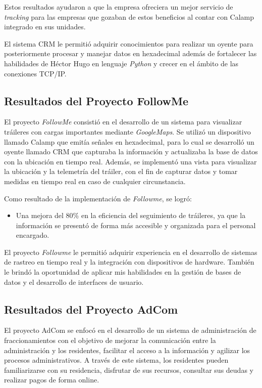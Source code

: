 \documentclass[protocolo.tex]{subfiles}
\begin{document}
Estos resultados ayudaron a que la empresa ofreciera un mejor servicio de \textit{tracking} para las empresas que gozaban de estos beneficios al contar con Calamp integrado en sus unidades. \vspace{4mm}

El sistema CRM le permitió adquirir conocimientos para realizar un oyente para posteriormente procesar y manejar datos en hexadecimal además de fortalecer las habilidades de Héctor Hugo en lenguaje \textit{Python} y crecer en el ámbito de las conexiones TCP/IP.

\subsection{Resultados del Proyecto FollowMe}

El proyecto \textit{FollowMe} consistió en el desarrollo de un sistema para visualizar tráileres con cargas importantes mediante \textit{GoogleMaps}.  Se utilizó un dispositivo llamado Calamp que emitía señales en hexadecimal, para lo cual se desarrolló un oyente llamado CRM que capturaba la información y  actualizaba la base de datos con la ubicación en tiempo real.  Además, se implementó una vista para visualizar la ubicación y la telemetría del tráiler, con el fin de capturar datos y tomar medidas en tiempo real en caso de cualquier circunstancia.\vspace{4mm}

Como resultado de la implementación de \textit{Followme}, se logró:

\begin{itemize}
\item Una mejora del 80\% en la eficiencia del seguimiento de tráileres, ya que la información se  presentó  de forma más accesible y organizada para el personal encargado.
\end{itemize}

El proyecto \textit{Followme} le permitió adquirir experiencia en el desarrollo de sistemas de rastreo en tiempo real y la integración con dispositivos de hardware.  También le brindó la oportunidad de aplicar mis habilidades en la gestión de bases de datos y el desarrollo de interfaces de usuario.


\subsection{Resultados del Proyecto AdCom}

El proyecto AdCom se enfocó en el desarrollo de un sistema de administración de fraccionamientos con el objetivo de  mejorar la comunicación entre la administración y los residentes,  facilitar el acceso a la información y agilizar los procesos administrativos.  A través de este sistema, los residentes pueden  familiarizarse con su residencia,  disfrutar de sus recursos,  consultar sus deudas y realizar pagos de forma online.\vspace{4mm}
\end{document}
